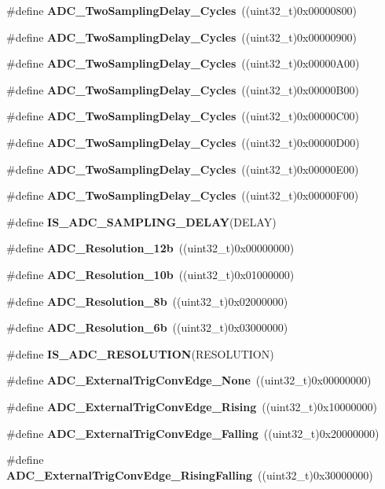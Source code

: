 \begin{DoxyCompactItemize}
\item 
\#define \textbf{ A\+D\+C\+\_\+\+Two\+Sampling\+Delay\+\_\+Cycles}~((uint32\+\_\+t)0x00000800)
\item 
\#define \textbf{ A\+D\+C\+\_\+\+Two\+Sampling\+Delay\+\_\+Cycles}~((uint32\+\_\+t)0x00000900)
\item 
\#define \textbf{ A\+D\+C\+\_\+\+Two\+Sampling\+Delay\+\_\+Cycles}~((uint32\+\_\+t)0x00000\+A00)
\item 
\#define \textbf{ A\+D\+C\+\_\+\+Two\+Sampling\+Delay\+\_\+Cycles}~((uint32\+\_\+t)0x00000\+B00)
\item 
\#define \textbf{ A\+D\+C\+\_\+\+Two\+Sampling\+Delay\+\_\+Cycles}~((uint32\+\_\+t)0x00000\+C00)
\item 
\#define \textbf{ A\+D\+C\+\_\+\+Two\+Sampling\+Delay\+\_\+Cycles}~((uint32\+\_\+t)0x00000\+D00)
\item 
\#define \textbf{ A\+D\+C\+\_\+\+Two\+Sampling\+Delay\+\_\+Cycles}~((uint32\+\_\+t)0x00000\+E00)
\item 
\#define \textbf{ A\+D\+C\+\_\+\+Two\+Sampling\+Delay\+\_\+Cycles}~((uint32\+\_\+t)0x00000\+F00)
\item 
\#define \textbf{ I\+S\+\_\+\+A\+D\+C\+\_\+\+S\+A\+M\+P\+L\+I\+N\+G\+\_\+\+D\+E\+L\+AY}(D\+E\+L\+AY)
\item 
\#define \textbf{ A\+D\+C\+\_\+\+Resolution\+\_\+12b}~((uint32\+\_\+t)0x00000000)
\item 
\#define \textbf{ A\+D\+C\+\_\+\+Resolution\+\_\+10b}~((uint32\+\_\+t)0x01000000)
\item 
\#define \textbf{ A\+D\+C\+\_\+\+Resolution\+\_\+8b}~((uint32\+\_\+t)0x02000000)
\item 
\#define \textbf{ A\+D\+C\+\_\+\+Resolution\+\_\+6b}~((uint32\+\_\+t)0x03000000)
\item 
\#define \textbf{ I\+S\+\_\+\+A\+D\+C\+\_\+\+R\+E\+S\+O\+L\+U\+T\+I\+ON}(R\+E\+S\+O\+L\+U\+T\+I\+ON)
\item 
\#define \textbf{ A\+D\+C\+\_\+\+External\+Trig\+Conv\+Edge\+\_\+\+None}~((uint32\+\_\+t)0x00000000)
\item 
\#define \textbf{ A\+D\+C\+\_\+\+External\+Trig\+Conv\+Edge\+\_\+\+Rising}~((uint32\+\_\+t)0x10000000)
\item 
\#define \textbf{ A\+D\+C\+\_\+\+External\+Trig\+Conv\+Edge\+\_\+\+Falling}~((uint32\+\_\+t)0x20000000)
\item 
\#define \textbf{ A\+D\+C\+\_\+\+External\+Trig\+Conv\+Edge\+\_\+\+Rising\+Falling}~((uint32\+\_\+t)0x30000000)
\item 

\end{DoxyCompactItemize}
